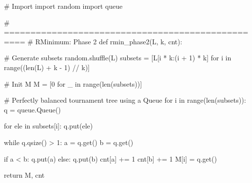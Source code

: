 \begin{python}
#   Import
import random
import queue

# ==================================================
#   RMinimum: Phase 2
def rmin_phase2(L, k, cnt):

    # Generate subsets
    random.shuffle(L)
    subsets = [L[i * k:(i + 1) * k] 
    		for i in range((len(L) + k - 1) // k)]

    # Init M
    M = [0 for _ in range(len(subsets))]

    # Perfectly balanced tournament tree using a Queue
    for i in range(len(subsets)):
        q = queue.Queue()

        for ele in subsets[i]:
            q.put(ele)

        while q.qsize() > 1:
            a = q.get()
            b = q.get()

            if a < b:
                q.put(a)
            else:
                q.put(b)
            cnt[a] += 1
            cnt[b] += 1
        M[i] = q.get()

    return M, cnt
\end{python}